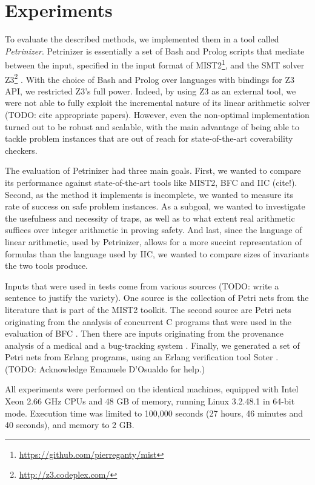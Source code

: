 \section{Experiments}

To evaluate the described methods, we implemented them in a tool called
\emph{Petrinizer}. Petrinizer is essentially a set of Bash and Prolog scripts
that mediate between the input, specified in the input format of
MIST2\footnote{\url{https://github.com/pierreganty/mist}}, and the SMT
solver Z3\footnote{\url{http://z3.codeplex.com/}} \cite{DeMouraTACAS08}. With
the choice of Bash and Prolog over languages with bindings for Z3 API, we
restricted Z3's full power. Indeed, by using Z3 as an external tool, we
were not able to fully exploit the incremental nature of its linear arithmetic
solver (TODO: cite appropriate papers). However, even the non-optimal
implementation turned out to be robust and scalable, with the main advantage of
being able to tackle problem instances that are out of reach for
state-of-the-art coverability checkers.

The evaluation of Petrinizer had three main goals. First, we wanted to compare
its performance against state-of-the-art tools like MIST2, BFC
and IIC (cite!). Second, as the method it
implements is incomplete, we wanted to measure its rate of success on safe problem instances. As a
subgoal, we wanted to investigate the usefulness and necessity of traps, as
well as to what extent real arithmetic suffices over integer arithmetic in
proving safety. And last, since the language of linear arithmetic, used by
Petrinizer, allows for a more succint representation of formulas than the
language used by IIC, we wanted to compare sizes of invariants the two tools produce.

Inputs that were used in tests come from various sources (TODO: write a
sentence to justify the variety).
One source is the collection of Petri nets from the literature that is part of the MIST2 toolkit.
The second source are Petri nets originating from the analysis of concurrent C
programs that were used in the evaluation of BFC \cite{KaiserCONCUR12}. Then
there are inputs originating from the provenance analysis of a medical and a
bug-tracking system \cite{MajumdarSAS13}. Finally, we generated a set of Petri
nets from Erlang programs, using an Erlang verification tool Soter
\cite{DOsualdoSAS13}. (TODO: Acknowledge Emanuele D'Osualdo for help.)

All experiments were performed on the identical machines, equipped with
Intel Xeon 2.66 GHz CPUs and 48 GB of memory, running Linux 3.2.48.1 in 64-bit
mode. Execution time was limited to 100,000 seconds (27 hours, 46 minutes and
40 seconds), and memory to 2 GB.

